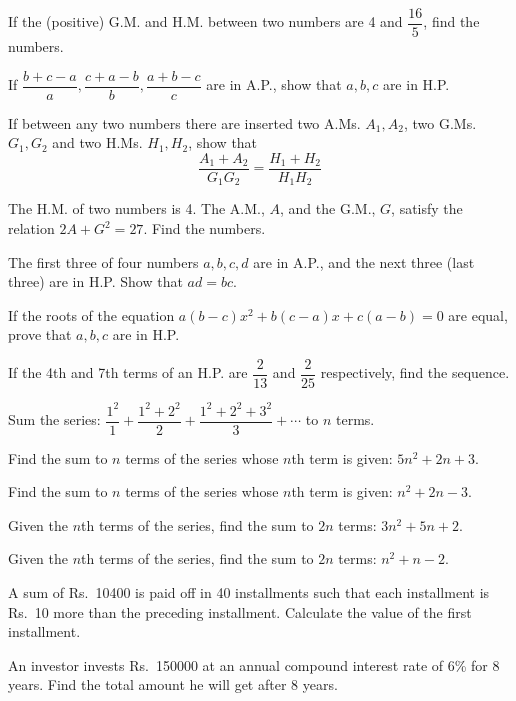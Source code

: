 \documentclass[11pt,a4paper]{article}
\begin{document}
\begin{longlist}
\item If the (positive) G.M. and H.M. between two numbers are 4 and $\dfrac{16}{5}$, find the numbers.

\item If $\dfrac{b+c-a}{a}, \dfrac{c+a-b}{b}, \dfrac{a+b-c}{c}$ are in A.P., show that $a,b,c$ are in H.P.

\item If between any two numbers there are inserted two A.Ms. $A_1,A_2$, two G.Ms. $G_1,G_2$ and two H.Ms. $H_1,H_2$, show that
\[
\frac{A_1+A_2}{G_1G_2}=\frac{H_1+H_2}{H_1H_2}
\]

\item The H.M. of two numbers is 4. The A.M., $A$, and the G.M., $G$, satisfy the relation $2A+G^2=27$. Find the numbers.

\item The first three of four numbers $a,b,c,d$ are in A.P., and the next three (last three) are in H.P. Show that $ad=bc$.

\item If the roots of the equation $a(b-c)x^2+b(c-a)x+c(a-b)=0$ are equal, prove that $a,b,c$ are in H.P.

\item If the 4th and 7th terms of an H.P. are $\dfrac{2}{13}$ and $\dfrac{2}{25}$ respectively, find the sequence.

\item Sum the series: $\dfrac{1^2}{1}+\dfrac{1^2+2^2}{2}+\dfrac{1^2+2^2+3^2}{3}+\cdots$ to $n$ terms.

\item Find the sum to $n$ terms of the series whose $n$th term is given: $5n^2+2n+3$.

\item Find the sum to $n$ terms of the series whose $n$th term is given: $n^2+2n-3$.

\item Given the $n$th terms of the series, find the sum to $2n$ terms: $3n^2+5n+2$.

\item Given the $n$th terms of the series, find the sum to $2n$ terms: $n^2+n-2$.

\item A sum of Rs.~10400 is paid off in 40 installments such that each installment is Rs.~10 more than the preceding installment. Calculate the value of the first installment.

\item An investor invests Rs.~150000 at an annual compound interest rate of 6\% for 8 years. Find the total amount he will get after 8 years.


\end{longlist}
\end{document}
